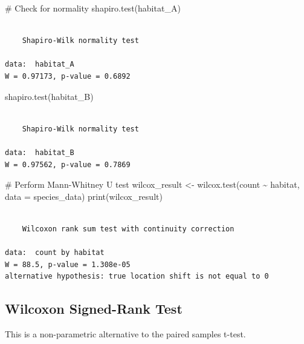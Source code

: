 \documentclass[
  letterpaper,
]{book}
\newenvironment{Shaded}{\begin{snugshade}}{\end{snugshade}}
\newcommand{\AttributeTok}[1]{\textcolor[rgb]{0.40,0.45,0.13}{#1}}
\newcommand{\CommentTok}[1]{\textcolor[rgb]{0.37,0.37,0.37}{#1}}
\newcommand{\FunctionTok}[1]{\textcolor[rgb]{0.28,0.35,0.67}{#1}}
\newcommand{\NormalTok}[1]{\textcolor[rgb]{0.00,0.23,0.31}{#1}}
\newcommand{\OtherTok}[1]{\textcolor[rgb]{0.00,0.23,0.31}{#1}}
\newcommand{\SpecialCharTok}[1]{\textcolor[rgb]{0.37,0.37,0.37}{#1}}
\begin{document}
\begin{Shaded}
\begin{Highlighting}[]
\CommentTok{\# Check for normality}
\FunctionTok{shapiro.test}\NormalTok{(habitat\_A)}
\end{Highlighting}
\end{Shaded}

\begin{verbatim}

    Shapiro-Wilk normality test

data:  habitat_A
W = 0.97173, p-value = 0.6892
\end{verbatim}

\begin{Shaded}
\begin{Highlighting}[]
\FunctionTok{shapiro.test}\NormalTok{(habitat\_B)}
\end{Highlighting}
\end{Shaded}

\begin{verbatim}

    Shapiro-Wilk normality test

data:  habitat_B
W = 0.97562, p-value = 0.7869
\end{verbatim}

\begin{Shaded}
\begin{Highlighting}[]
\CommentTok{\# Perform Mann{-}Whitney U test}
\NormalTok{wilcox\_result }\OtherTok{\textless{}{-}} \FunctionTok{wilcox.test}\NormalTok{(count }\SpecialCharTok{\textasciitilde{}}\NormalTok{ habitat, }\AttributeTok{data =}\NormalTok{ species\_data)}
\FunctionTok{print}\NormalTok{(wilcox\_result)}
\end{Highlighting}
\end{Shaded}

\begin{verbatim}

    Wilcoxon rank sum test with continuity correction

data:  count by habitat
W = 88.5, p-value = 1.308e-05
alternative hypothesis: true location shift is not equal to 0
\end{verbatim}

\subsection{Wilcoxon Signed-Rank Test}\label{wilcoxon-signed-rank-test}

This is a non-parametric alternative to the paired samples t-test.
\end{document}
